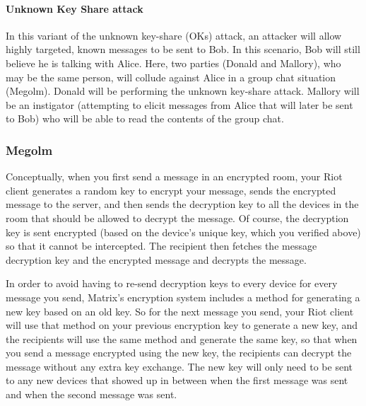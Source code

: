\paragraph{Unknown Key Share attack}

In this variant of the unknown key-share (OKs) attack, an attacker will allow highly targeted, known messages to be sent to Bob. In this scenario, Bob will still believe he is talking with Alice. Here, two parties (Donald and Mallory), who may be the same person, will collude against Alice in a group chat situation (Megolm). Donald will be performing the unknown key-share attack. Mallory will be an instigator (attempting to elicit messages from Alice that will later be sent to Bob) who will be able to read the contents of the group chat.

\subsubsection{Megolm}



Conceptually, when you first send a message in an encrypted room, your Riot client generates a random key to encrypt your message, sends the encrypted message to the server, and then sends the decryption key to all the devices in the room that should be allowed to decrypt the message. Of course, the decryption key is sent encrypted (based on the device's unique key, which you verified above) so that it cannot be intercepted. The recipient then fetches the message decryption key and the encrypted message and decrypts the message.

In order to avoid having to re-send decryption keys to every device for every message you send, Matrix's encryption system includes a method for generating a new key based on an old key. So for the next message you send, your Riot client will use that method on your previous encryption key to generate a new key, and the recipients will use the same method and generate the same key, so that when you send a message encrypted using the new key, the recipients can decrypt the message without any extra key exchange. The new key will only need to be sent to any new devices that showed up in between when the first message was sent and when the second message was sent.

